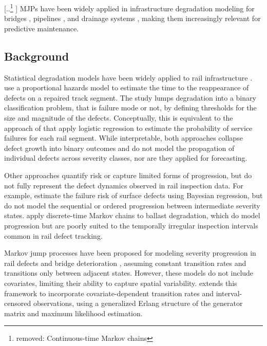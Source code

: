 \documentclass{article}
\providecommand{\DIFadd}[1]{{\protect\color{blue} \sf #1}} %
\providecommand{\DIFdel}[1]{{\protect\color{red} [..\footnote{removed: #1} ]}} %
\providecommand{\DIFaddbegin}{} %
\providecommand{\DIFaddend}{} %
\providecommand{\DIFdelbegin}{} %
\providecommand{\DIFdelend}{} %
\begin{document}
\DIFdelbegin \DIFdel{Continuous-time Markov chains }\DIFdelend \DIFaddbegin \DIFadd{MJPs }\DIFaddend have been widely applied in infrastructure degradation modeling for bridges \citep{Mizutani2023RegimeSwitching}, pipelines \citep{JimenezRoa2024Nonhomogeneous}, and drainage systems \citep{Wu2021ConditionPrediction}, making them increasingly relevant for predictive maintenance. %

\subsection{Background} \label{sec:background}%
Statistical degradation models have been widely applied to rail infrastructure \citep{Davari2021AIndustry}.
\citet{ghofrani2019a} use a proportional hazards model to estimate the time to the reappearance of defects on a repaired track segment. The study lumps degradation into a binary classification problem, that is failure mode or not, by defining thresholds for the size and magnitude of the defects. Conceptually, this is equivalent to the approach of \citet{dick2003a} that apply logistic regression to estimate the probability of service failures for each rail segment. While interpretable, both approaches collapse defect growth into binary outcomes and do not model the propagation of individual defects across severity classes, nor are they applied for forecasting.

Other approaches quantify risk or capture limited forms of progression, but do not fully represent the defect dynamics observed in rail inspection data. For example, \citet{jamshidi2016a} estimate the failure risk of surface defects using Bayesian regression, but do not model the sequential or ordered progression between intermediate severity states. \citet{bressi2021a} apply discrete-time Markov chains to ballast degradation, which do model progression but are poorly suited to the temporally irregular inspection intervals common in rail defect tracking.

Markov jump processes have been proposed for modeling severity progression in rail defects \citep{podofillini2006a} and bridge deterioration \citep{sun2024a}, assuming constant transition rates and transitions only between adjacent states. However, these models do not include covariates, limiting their ability to capture spatial variability. \citet{bisgaard2024A} extends this framework to incorporate covariate-dependent transition rates and interval-censored observations, using a generalized Erlang structure \DIFaddbegin \DIFadd{of the generator matrix }\DIFaddend and maximum likelihood estimation.
\end{document}
